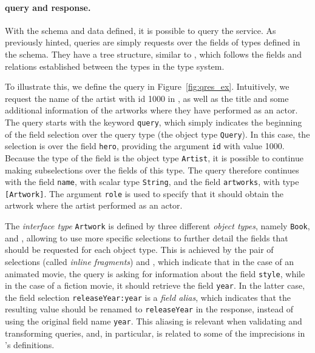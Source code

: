 

\paragraph{\gql query and response.}

With the schema and data defined, it is possible to query the service. 
As previously hinted, \gql queries are simply requests over the fields of types defined in the schema.
They have a tree structure, similar to \json, which follows the fields and relations established between the types
in the type system.

To illustrate this, we define the query in
Figure~\ref{fig:qres_ex}. Intuitively, we request the name of the artist
with id 1000 in \goodbois, as well as the title and some additional
information of the artworks where they have performed as an actor.
The query starts with the keyword \texttt{query}, which simply indicates the beginning
 of the field selection over the query type (the object type \texttt{Query}).
In this case, the selection is over the field
\texttt{hero}, providing the argument
\texttt{id} with value 1000. 
Because the type of the field is the object type \texttt{Artist}, 
it is possible to continue making subselections over the fields of this type. 
The query therefore continues with the field \texttt{name}, with scalar type \texttt{String}, and the field
\texttt{artworks}, with type \texttt{[Artwork]}. The argument \texttt{role} is
used to specify that it should obtain the artwork where the artist performed as an actor.  

The {\em interface
type} \texttt{Artwork} is defined by three different {\em object types},
namely \texttt{Book}, \fiction and \animation, allowing to use more specific
selections to further detail the fields that should be requested for
each object type. 
This is achieved by the pair of selections (called {\em inline fragments})
 and , which indicate that in the case of an 
  animated movie, the query is asking for information about the field
\texttt{style}, while in the case of a fiction movie, it should
retrieve the field \texttt{year}. In the latter case, the field selection
\texttt{releaseYear:year} is a {\em field alias}, which indicates that
the resulting value should be renamed to \texttt{releaseYear} in the response, instead of using the original field name \texttt{year}.
This aliasing is relevant when validating and transforming queries, and, in particular, 
is related to some of the imprecisions in \HP's definitions.

